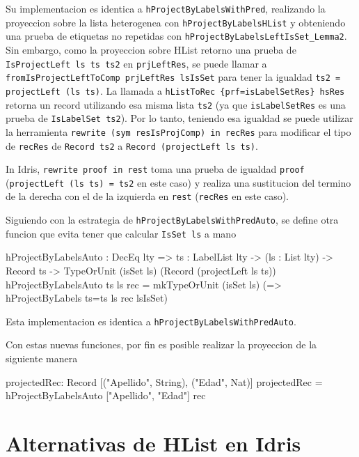 Su implementacion es identica a \texttt{hProjectByLabelsWithPred}, realizando la proyeccion sobre la lista heterogenea con \texttt{hProjectByLabelsHList} y obteniendo una prueba de etiquetas no repetidas con \texttt{hProjectByLabelsLeftIsSet\_Lemma2}. Sin embargo, como la proyeccion sobre HList retorno una prueba de \texttt{IsProjectLeft ls ts ts2} en \texttt{prjLeftRes}, se puede llamar a \texttt{fromIsProjectLeftToComp prjLeftRes lsIsSet} para tener la igualdad \texttt{ts2 = projectLeft (ls ts)}. La llamada a \texttt{hListToRec \{prf=isLabelSetRes\} hsRes} retorna un record utilizando esa misma lista \texttt{ts2} (ya que \texttt{isLabelSetRes} es una prueba de \texttt{IsLabelSet ts2}). Por lo tanto, teniendo esa igualdad se puede utilizar la herramienta \texttt{rewrite (sym resIsProjComp) in recRes} para modificar el tipo de \texttt{recRes} de \texttt{Record ts2} a \texttt{Record (projectLeft ls ts)}.

In Idris, \texttt{rewrite proof in rest} toma una prueba de igualdad \texttt{proof} (\texttt{projectLeft (ls ts) = ts2} en este caso) y realiza una sustitucion del termino de la derecha con el de la izquierda en \texttt{rest} (\texttt{recRes} en este caso).

Siguiendo con la estrategia de \texttt{hProjectByLabelsWithPredAuto}, se define otra funcion que evita tener que calcular \texttt{IsSet ls} a mano

\begin{code}
hProjectByLabelsAuto : DecEq lty => 
  {ts : LabelList lty} -> (ls : List lty) -> 
  Record ts -> TypeOrUnit (isSet ls) 
  (Record (projectLeft ls ts))
hProjectByLabelsAuto {ts} ls rec = 
  mkTypeOrUnit (isSet ls) 
  (\lsIsSet => hProjectByLabels {ts=ts} ls rec lsIsSet)
\end{code}

Esta implementacion es identica a \texttt{hProjectByLabelsWithPredAuto}.

Con estas nuevas funciones, por fin es posible realizar la proyeccion de la siguiente manera

\begin{code}
projectedRec: Record [("Apellido", String), 
  ("Edad", Nat)]
projectedRec = hProjectByLabelsAuto 
  ["Apellido", "Edad"] rec
\end{code}


\section{Alternativas de HList en Idris}

